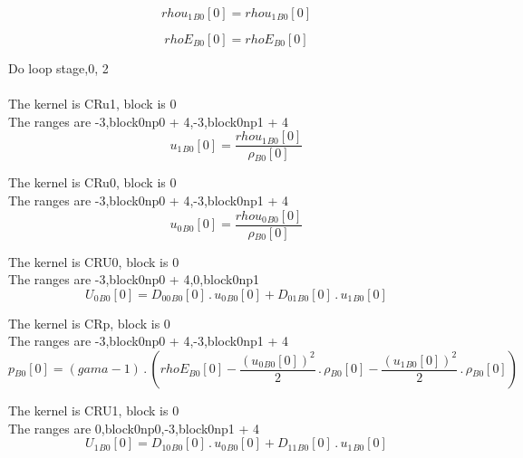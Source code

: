\documentclass{article}
\begin{document}
\begin{dmath}{rhou_{1}{_{B0}}}[{0}] = {rhou_{1}{_{B0}}}[{0}]\end{dmath}

\begin{dmath}{rhoE{_{B0}}}[{0}] = {rhoE{_{B0}}}[{0}]\end{dmath}

\noindent Do loop stage,0, 2\\
\\\noindent The kernel is CRu1, block is 0\\\noindent The ranges are -3,block0np0 + 4,-3,block0np1 + 4\\\begin{dmath}{u_{1}{_{B0}}}[{0}] = \frac{{rhou_{1}{_{B0}}}[{0}]}{{\rho{_{B0}}}[{0}]}\end{dmath}

\noindent The kernel is CRu0, block is 0\\\noindent The ranges are -3,block0np0 + 4,-3,block0np1 + 4\\\begin{dmath}{u_{0}{_{B0}}}[{0}] = \frac{{rhou_{0}{_{B0}}}[{0}]}{{\rho{_{B0}}}[{0}]}\end{dmath}

\noindent The kernel is CRU0, block is 0\\\noindent The ranges are -3,block0np0 + 4,0,block0np1\\\begin{dmath}{U_{0}{_{B0}}}[{0}] = {D_{00}{_{B0}}}[{0}] \,.\, {u_{0}{_{B0}}}[{0}] + {D_{01}{_{B0}}}[{0}] \,.\, {u_{1}{_{B0}}}[{0}]\end{dmath}

\noindent The kernel is CRp, block is 0\\\noindent The ranges are -3,block0np0 + 4,-3,block0np1 + 4\\\begin{dmath}{p{_{B0}}}[{0}] = \left(gama - 1\right) \,.\, \left({rhoE{_{B0}}}[{0}] - \frac{\left({u_{0}{_{B0}}}[{0}] \right)^{2}}{2} \,.\, {\rho{_{B0}}}[{0}] - \frac{\left({u_{1}{_{B0}}}[{0}] \right)^{2}}{2} \,.\, 
{\rho{_{B0}}}[{0}]\right)\end{dmath}

\noindent The kernel is CRU1, block is 0\\\noindent The ranges are 0,block0np0,-3,block0np1 + 4\\\begin{dmath}{U_{1}{_{B0}}}[{0}] = {D_{10}{_{B0}}}[{0}] \,.\, {u_{0}{_{B0}}}[{0}] + {D_{11}{_{B0}}}[{0}] \,.\, {u_{1}{_{B0}}}[{0}]\end{dmath}
\end{document}

